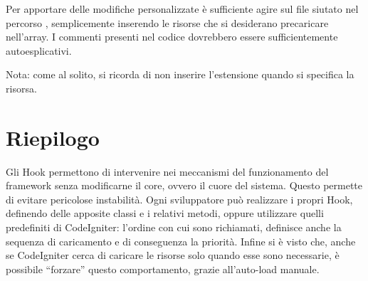 Per apportare delle modifiche personalizzate è sufficiente agire sul file  siutato nel percorso , semplicemente inserendo le risorse che si desiderano precaricare nell'array. I commenti presenti nel codice dovrebbero essere sufficientemente autoesplicativi.

Nota: come al solito, si ricorda di non inserire l'estensione  quando si specifica la risorsa.

\section{Riepilogo}
Gli Hook permettono di intervenire nei meccanismi del funzionamento del framework senza modificarne il core, ovvero il cuore del sistema. Questo permette di evitare pericolose instabilità. Ogni sviluppatore può realizzare i propri Hook, definendo delle apposite classi e i relativi metodi, oppure utilizzare quelli predefiniti di CodeIgniter: l'ordine con cui sono richiamati, definisce anche la sequenza di caricamento e di conseguenza la priorità. Infine si è visto che, anche se CodeIgniter cerca di caricare le risorse solo quando esse sono necessarie, è possibile ``forzare'' questo comportamento, grazie all'auto-load manuale.